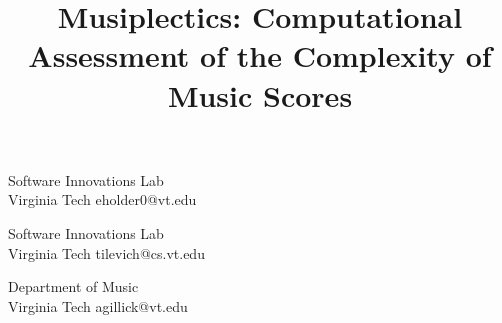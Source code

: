 \documentclass[10pt,preprint]{sigplanconf}
\begin{document}

\title{Musiplectics: Computational Assessment of the Complexity of Music Scores}

					 {Software Innovations Lab\\Virginia Tech}
					 {eholder0@vt.edu}
					 
					 {Software Innovations Lab\\Virginia Tech}
					 {tilevich@cs.vt.edu}
					 
					 {Department of Music\\Virginia Tech}
					 {agillick@vt.edu}
					 

\maketitle
\end{document}
